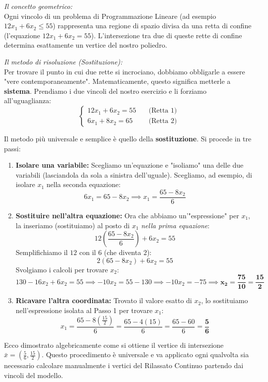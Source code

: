 \documentclass[12pt, a4paper]{article}
\begin{document}
	\textit{Il concetto geometrico:}\\
	Ogni vincolo di un problema di Programmazione Lineare (ad esempio $12x_1 + 6x_2 \leq 55$) rappresenta una regione di spazio divisa da una retta di confine (l'equazione $12x_1 + 6x_2 = 55$). L'intersezione tra due di queste rette di confine determina esattamente un vertice del nostro poliedro. 
	
	\textit{Il metodo di risoluzione (Sostituzione):}\\
	Per trovare il punto in cui due rette si incrociano, dobbiamo obbligarle a essere "vere contemporaneamente". Matematicamente, questo significa metterle a \textbf{sistema}.
	Prendiamo i due vincoli del nostro esercizio e li forziamo all'uguaglianza:
	\[
	\begin{cases}
		12x_1 + 6x_2 = 55 \quad &\text{(Retta 1)} \\
		6x_1 + 8x_2 = 65 \quad &\text{(Retta 2)}
	\end{cases}
	\]
	
	Il metodo più universale e semplice è quello della \textbf{sostituzione}. Si procede in tre passi:
	\begin{enumerate}
		\item \textbf{Isolare una variabile:} Scegliamo un'equazione e "isoliamo" una delle due variabili (lasciandola da sola a sinistra dell'uguale). Scegliamo, ad esempio, di isolare $x_1$ nella seconda equazione:
		\[
		6x_1 = 65 - 8x_2 \implies x_1 = \frac{65 - 8x_2}{6}
		\]
		
		\item \textbf{Sostituire nell'altra equazione:} Ora che abbiamo un'"espressione" per $x_1$, la inseriamo (sostituiamo) al posto di $x_1$ \textit{nella prima equazione}:
		\[
		12\left( \frac{65 - 8x_2}{6} \right) + 6x_2 = 55
		\]
		Semplifichiamo il $12$ con il $6$ (che diventa $2$):
		\[
		2(65 - 8x_2) + 6x_2 = 55
		\]
		Svolgiamo i calcoli per trovare $x_2$:
		\[
		130 - 16x_2 + 6x_2 = 55 \implies -10x_2 = 55 - 130 \implies -10x_2 = -75 \implies \mathbf{x_2 = \frac{75}{10} = \frac{15}{2}}
		\]
		
		\item \textbf{Ricavare l'altra coordinata:} Trovato il valore esatto di $x_2$, lo sostituiamo nell'espressione isolata al Passo 1 per trovare $x_1$:
		\[
		x_1 = \frac{65 - 8\left(\frac{15}{2}\right)}{6} = \frac{65 - 4(15)}{6} = \frac{65 - 60}{6} = \mathbf{\frac{5}{6}}
		\]
	\end{enumerate}
	
	Ecco dimostrato algebricamente come si ottiene il vertice di intersezione $\bar{x} = \left(\frac{5}{6}, \frac{15}{2}\right)$. Questo procedimento è universale e va applicato ogni qualvolta sia necessario calcolare manualmente i vertici del Rilassato Continuo partendo dai vincoli del modello.
	
\end{document}
